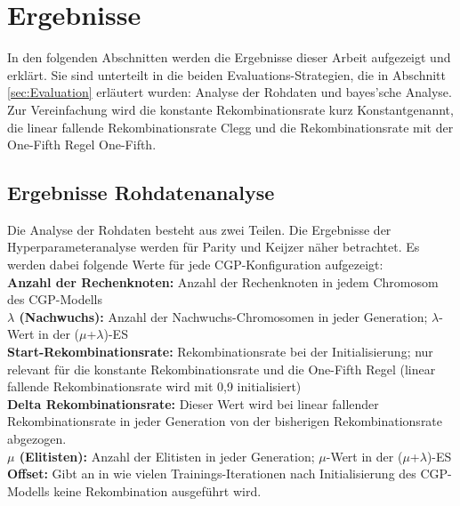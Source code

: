 \chapter{Ergebnisse}
\label{Ergebnisse}

In den folgenden Abschnitten werden die Ergebnisse dieser Arbeit aufgezeigt und erklärt.
Sie sind unterteilt in die beiden Evaluations-Strategien, die in Abschnitt \ref{sec:Evaluation} erläutert wurden: Analyse der Rohdaten und bayes'sche Analyse.
Zur Vereinfachung wird die konstante Rekombinationsrate kurz \glqq Konstant\grqq\space genannt, die linear fallende Rekombinationsrate \glqq Clegg \grqq\space und die Rekombinationsrate mit der One-Fifth Regel \glqq One-Fifth\grqq.

\section{Ergebnisse Rohdatenanalyse}
\label{sec:ergebnisseRohdaten}

Die Analyse der Rohdaten besteht aus zwei Teilen.
Die Ergebnisse der Hyperparameteranalyse werden für Parity und Keijzer näher betrachtet.
Es werden dabei folgende Werte für jede CGP-Konfiguration aufgezeigt:\\
\textbf{Anzahl der Rechenknoten:} Anzahl der Rechenknoten in jedem Chromosom des CGP-Modells\\
\textbf{$\lambda$ (Nachwuchs):} Anzahl der Nachwuchs-Chromosomen in jeder Generation; $\lambda$-Wert in der ($\mu$+$\lambda$)-ES\\
\textbf{Start-Rekombinationsrate:} Rekombinationsrate bei der Initialisierung; nur relevant für die konstante Rekombinationsrate und die One-Fifth Regel (linear fallende Rekombinationsrate wird mit 0,9 initialisiert)\\
\textbf{Delta Rekombinationsrate:} Dieser Wert wird bei linear fallender Rekombinationsrate in jeder Generation von der bisherigen Rekombinationsrate abgezogen.\\
\textbf{$\mu$ (Elitisten):} Anzahl der Elitisten in jeder Generation; $\mu$-Wert in der ($\mu$+$\lambda$)-ES\\
\textbf{Offset:} Gibt an in wie vielen Trainings-Iterationen nach Initialisierung des CGP-Modells keine Rekombination ausgeführt wird.

